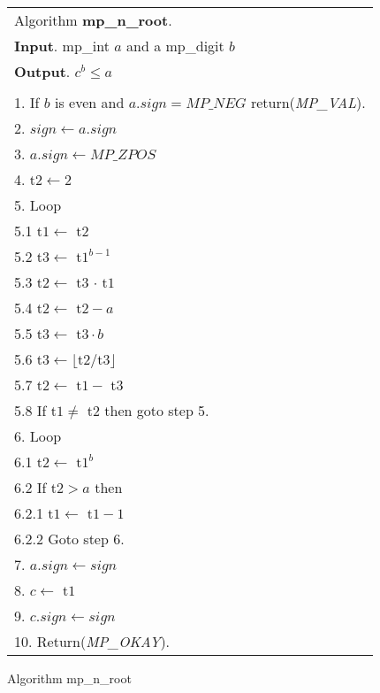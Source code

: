 \documentclass[b5paper]{book}
\begin{document}
\newpage\begin{figure}[!here]
\begin{small}
\begin{center}
\begin{tabular}{l}
\hline Algorithm \textbf{mp\_n\_root}. \\
\textbf{Input}.   mp\_int $a$ and a mp\_digit $b$ \\
\textbf{Output}.  $c^b \le a$ \\
\hline \\
1.  If $b$ is even and $a.sign = MP\_NEG$ return(\textit{MP\_VAL}). \\
2.  $sign \leftarrow a.sign$ \\
3.  $a.sign \leftarrow MP\_ZPOS$ \\
4.  t$2 \leftarrow 2$ \\
5.  Loop \\
\hspace{3mm}5.1  t$1 \leftarrow $ t$2$ \\
\hspace{3mm}5.2  t$3 \leftarrow $ t$1^{b - 1}$ \\
\hspace{3mm}5.3  t$2 \leftarrow $ t$3 $ $\cdot$ t$1$ \\
\hspace{3mm}5.4  t$2 \leftarrow $ t$2 - a$ \\
\hspace{3mm}5.5  t$3 \leftarrow $ t$3 \cdot b$ \\
\hspace{3mm}5.6  t$3 \leftarrow \lfloor $t$2 / $t$3 \rfloor$ \\
\hspace{3mm}5.7  t$2 \leftarrow $ t$1 - $ t$3$ \\
\hspace{3mm}5.8  If t$1 \ne $ t$2$ then goto step 5.  \\
6.  Loop \\
\hspace{3mm}6.1  t$2 \leftarrow $ t$1^b$ \\
\hspace{3mm}6.2  If t$2 > a$ then \\
\hspace{6mm}6.2.1  t$1 \leftarrow $ t$1 - 1$ \\
\hspace{6mm}6.2.2  Goto step 6. \\
7.  $a.sign \leftarrow sign$ \\
8.  $c \leftarrow $ t$1$ \\
9.  $c.sign \leftarrow sign$  \\
10.  Return(\textit{MP\_OKAY}).  \\
\hline
\end{tabular}
\end{center}
\end{small}
\caption{Algorithm mp\_n\_root}
\end{figure}
\end{document}
